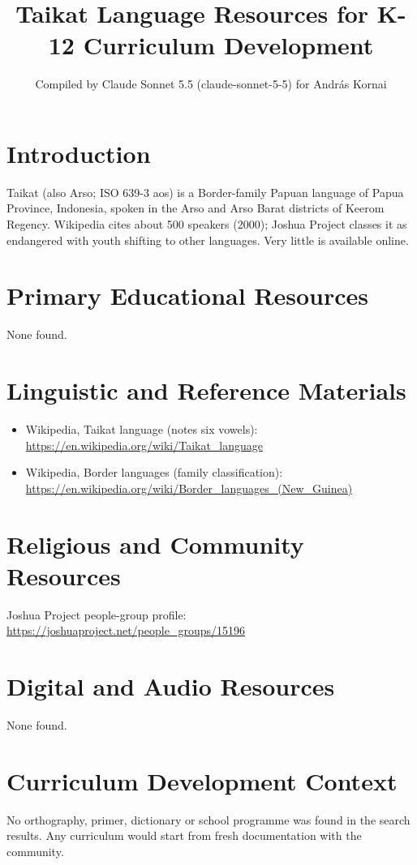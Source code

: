 \documentclass[12pt]{article}
\title{Taikat Language Resources for K-12 Curriculum Development}
\author{Compiled by Claude Sonnet 5.5 (claude-sonnet-5-5) for Andr\'as Kornai}
\date{}
\begin{document}
\maketitle

\section{Introduction}
Taikat (also Arso; ISO 639-3 aos) is a Border-family Papuan language of Papua Province, Indonesia, spoken in the Arso and Arso Barat districts of Keerom Regency. Wikipedia cites about 500 speakers (2000); Joshua Project classes it as endangered with youth shifting to other languages. Very little is available online.

\section{Primary Educational Resources}
None found.

\section{Linguistic and Reference Materials}
\begin{itemize}
\item Wikipedia, Taikat language (notes six vowels): \url{https://en.wikipedia.org/wiki/Taikat_language}
\item Wikipedia, Border languages (family classification): \url{https://en.wikipedia.org/wiki/Border_languages_(New_Guinea)}
\end{itemize}

\section{Religious and Community Resources}
Joshua Project people-group profile: \url{https://joshuaproject.net/people_groups/15196}

\section{Digital and Audio Resources}
None found.

\section{Curriculum Development Context}
No orthography, primer, dictionary or school programme was found in the search results. Any curriculum would start from fresh documentation with the community.
\end{document}
